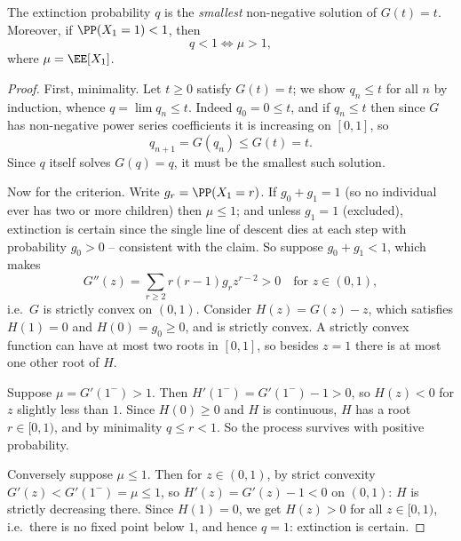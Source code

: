 \begin{center}
\end{center}

\begin{theorem}
	The extinction probability $q$ is the \emph{smallest} non-negative solution of $G(t) = t$. Moreover, if $\PP(X_1 = 1) < 1$, then
	$$
	q < 1 \iff \mu > 1,
	$$
	where $\mu = \EE[X_1]$.
\end{theorem}
\begin{proof}
	First, minimality. Let $t \geq 0$ satisfy $G(t) = t$; we show $q_n \leq t$ for all $n$ by induction, whence $q = \lim q_n \leq t$. Indeed $q_0 = 0 \leq t$, and if $q_n \leq t$ then since $G$ has non-negative power series coefficients it is increasing on $[0, 1]$, so
	$$
	q_{n + 1} = G(q_n) \leq G(t) = t.
	$$
	Since $q$ itself solves $G(q) = q$, it must be the smallest such solution.

	Now for the criterion. Write $g_r = \PP(X_1 = r)$. If $g_0 + g_1 = 1$ (so no individual ever has two or more children) then $\mu \leq 1$; and unless $g_1 = 1$ (excluded), extinction is certain since the single line of descent dies at each step with probability $g_0 > 0$ -- consistent with the claim. So suppose $g_0 + g_1 < 1$, which makes
	$$
	G''(z) = \sum_{r \geq 2} r(r - 1)g_r z^{r - 2} > 0 \quad \text{for } z \in (0, 1),
	$$
	i.e.\ $G$ is strictly convex on $(0, 1)$. Consider $H(z) = G(z) - z$, which satisfies $H(1) = 0$ and $H(0) = g_0 \geq 0$, and is strictly convex. A strictly convex function can have at most two roots in $[0,1]$, so besides $z = 1$ there is at most one other root of $H$.

	Suppose $\mu = G'(1^-) > 1$. Then $H'(1^-) = G'(1^-) - 1 > 0$, so $H(z) < 0$ for $z$ slightly less than $1$. Since $H(0) \geq 0$ and $H$ is continuous, $H$ has a root $r \in [0, 1)$, and by minimality $q \leq r < 1$. So the process survives with positive probability.

	Conversely suppose $\mu \leq 1$. Then for $z \in (0,1)$, by strict convexity $G'(z) < G'(1^-) = \mu \leq 1$, so $H'(z) = G'(z) - 1 < 0$ on $(0, 1)$: $H$ is strictly decreasing there. Since $H(1) = 0$, we get $H(z) > 0$ for all $z \in [0, 1)$, i.e.\ there is no fixed point below $1$, and hence $q = 1$: extinction is certain.
\end{proof}

